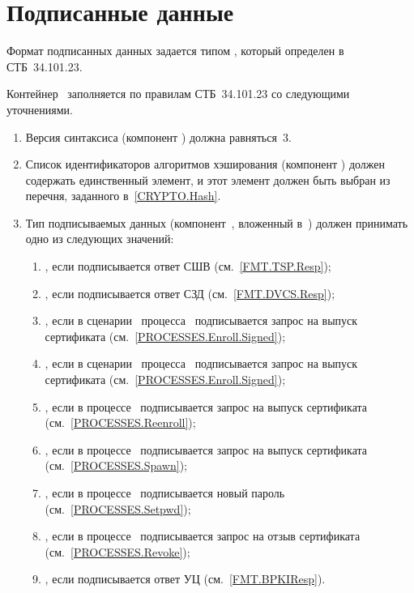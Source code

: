 \section{Подписанные данные}\label{FMT.SignedData}

Формат подписанных данных задается типом , который определен в
СТБ~34.101.23.

Контейнер~ заполняется по правилам СТБ~34.101.23 со следующими
уточнениями.

\begin{enumerate}
\item
Версия синтаксиса (компонент ) должна равняться~$3$.

\item
Список идентификаторов алгоритмов хэширования (компонент
) должен содержать единственный элемент, и этот элемент
должен быть выбран из перечня, заданного в~\ref{CRYPTO.Hash}.

\item
Тип подписываемых данных (компонент~, вложенный 
в~) должен принимать одно из следующих значений:

\begin{enumerate}
\item
{}, если подписывается ответ СШВ (см.~\ref{FMT.TSP.Resp});
\item
{}, если подписывается ответ СЗД
(см.~\ref{FMT.DVCS.Resp});
\item
{}, если в сценарии~
процесса~ подписывается запрос на выпуск сертификата
(см.~\ref{PROCESSES.Enroll.Signed});
\item
{}, если в сценарии~
процесса~ подписывается запрос на выпуск сертификата
(см.~\ref{PROCESSES.Enroll.Signed});
\item
{}, если в процессе~ подписывается
запрос на выпуск сертификата (см.~\ref{PROCESSES.Reenroll});
\item
{}, если в процессе~ подписывается запрос на
выпуск сертификата (см.~\ref{PROCESSES.Spawn});
\item
{}, если в процессе~ подписывается новый
пароль (см.~\ref{PROCESSES.Setpwd});
\item
{}, если в процессе~ подписывается запрос на
отзыв сертификата (см.~\ref{PROCESSES.Revoke});
\item
{}, если подписывается ответ УЦ (см.~\ref{FMT.BPKIResp}).
\end{enumerate}


\end{enumerate}
